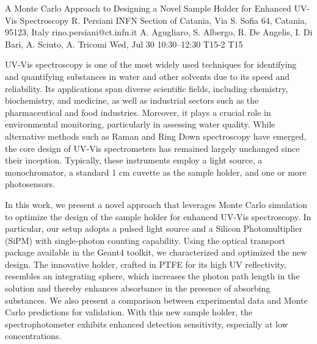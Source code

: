 \begin{talk}
  {A Monte Carlo Approach to Designing a Novel Sample Holder for Enhanced UV-Vis Spectroscopy}%
  {R. Persiani}%
  {INFN Section of Catania, Via S. Sofia 64, Catania, 95123, Italy}%
  {rino.persiani@ct.infn.it}%
  {A. Agugliaro, S. Albergo, R. De Angelis, I. Di Bari, A. Sciuto, A. Tricomi}%
  {}%
  {Wed, Jul 30 10:30–12:30}%
  {T15-2}%
  {T15}%
  
				
			
UV-Vis spectroscopy is one of the most widely used techniques for identifying and quantifying substances in water and other solvents due to its speed and reliability. Its applications span diverse scientific fields, including chemistry, biochemistry, and medicine, as well as industrial sectors such as the pharmaceutical and food industries. Moreover, it plays a crucial role in environmental monitoring, particularly in assessing water quality. While alternative methods such as Raman and Ring Down spectroscopy have emerged, the core design of UV-Vis spectrometers has remained largely unchanged since their inception. Typically, these instruments employ a light source, a monochromator, a standard 1 cm cuvette as the sample holder, and one or more photosensors.

In this work, we present a novel approach that leverages Monte Carlo simulation to optimize the design of the sample holder for enhanced UV-Vis spectroscopy. In particular, our setup adopts a pulsed light source and a Silicon Photomultiplier (SiPM) with single-photon counting capability. Using the optical transport package available in the Geant4 toolkit, we characterized and optimized the new design. The innovative holder, crafted in PTFE for its high UV reflectivity, resembles an integrating sphere, which increases the photon path length in the solution and thereby enhances absorbance in the presence of absorbing substances. We also present a comparison between experimental data and Monte Carlo predictions for validation. With this new sample holder, the spectrophotometer exhibits enhanced detection sensitivity, especially at low concentrations.

\medskip

\end{talk}

